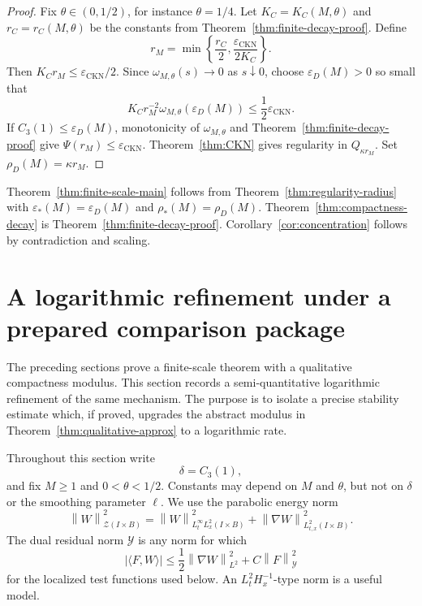 \documentclass[pdflatex,sn-mathphys-num]{sn-jnl}
\numberwithin{equation}{section}
\theoremstyle{thmstyleone}
\theoremstyle{thmstylethree}
\newcommand{\eps}{\varepsilon}
\newcommand{\CKN}{\mathrm{CKN}}
\newcommand{\norm}[2]{\left\|#1\right\|_{#2}}
\newcommand{\calY}{\mathcal Y}
\newcommand{\calZ}{\mathcal Z}
\begin{document}
\begin{proof}
Fix \(\theta\in(0,1/2)\), for instance \(\theta=1/4\).  Let \(K_C=K_C(M,\theta)\) and \(r_C=r_C(M,\theta)\) be the constants from Theorem~\ref{thm:finite-decay-proof}.  Define
\[
        r_M=\min\left\{\frac{r_C}{2},\frac{\eps_{\CKN}}{2K_C}\right\}.
\]
Then \(K_Cr_M\le\eps_{\CKN}/2\).  Since \(\omega_{M,\theta}(s)\to0\) as \(s\downarrow0\), choose \(\eps_D(M)>0\) so small that
\[
        K_Cr_M^{-2}\omega_{M,\theta}(\eps_D(M))
        \le \frac12\eps_{\CKN}.
\]
If \(C_3(1)\le\eps_D(M)\), monotonicity of \(\omega_{M,\theta}\) and Theorem~\ref{thm:finite-decay-proof} give \(\Psi(r_M)\le\eps_{\CKN}\).  Theorem~\ref{thm:CKN} gives regularity in \(Q_{\kappa r_M}\).  Set \(\rho_D(M)=\kappa r_M\).
\end{proof}

Theorem~\ref{thm:finite-scale-main} follows from Theorem~\ref{thm:regularity-radius} with \(\eps_*(M)=\eps_D(M)\) and \(\rho_*(M)=\rho_D(M)\).  Theorem~\ref{thm:compactness-decay} is Theorem~\ref{thm:finite-decay-proof}.  Corollary~\ref{cor:concentration} follows by contradiction and scaling.

\section{A logarithmic refinement under a prepared comparison package}
\label{sec:log}

The preceding sections prove a finite-scale theorem with a qualitative compactness modulus.  This section records a semi-quantitative logarithmic refinement of the same mechanism.  The purpose is to isolate a precise stability estimate which, if proved, upgrades the abstract modulus in Theorem~\ref{thm:qualitative-approx} to a logarithmic rate.

Throughout this section write
\[
        \delta=C_3(1),
\]
and fix \(M\ge1\) and \(0<\theta<1/2\).  Constants may depend on \(M\) and \(\theta\), but not on \(\delta\) or the smoothing parameter \(\ell\).  We use the parabolic energy norm
\[
        \norm{W}{\calZ(I\times B)}^2
        =\norm{W}{L^\infty_tL^2_x(I\times B)}^2
        +\norm{\nabla W}{L^2_{t,x}(I\times B)}^2.
\]
The dual residual norm \(\calY\) is any norm for which
\[
        |\langle F,W\rangle|
        \le \frac12\norm{\nabla W}{L^2}^2+C\norm{F}{\calY}^2
\]
for the localized test functions used below.  An \(L^2_tH^{-1}_x\)-type norm is a useful model.
\end{document}
